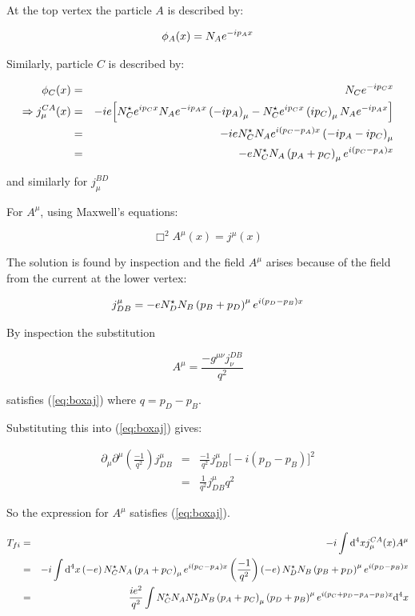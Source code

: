 At the top vertex the particle $A$ is described by:

\[
  \phi_A(x) = N_Ae^{-ip_Ax}
\]

Similarly, particle $C$ is described by:

\begin{eqnarray*}
  \phi_C(x) & = & N_Ce^{-ip_Cx} \\
  \Rightarrow j^{CA}_{\mu}(x) & = & -ie\Big[N^{\star}_Ce^{ip_Cx}N_Ae^{-ip_Ax}\left(-ip_A\right)_{\mu} - N^{\star}_C e^{ip_Cx}\left(ip_C\right)_{\mu}N_Ae^{-ip_Ax}\Big] \\
  & = & -ie N^{\star}_CN_Ae^{i\left(p_C-p_A\right)x}\left(-ip_A-ip_C\right)_{\mu} \\
  & = & -e N^{\star}_CN_A\left(p_A+p_C\right)_{\mu}e^{i\left(p_C-p_A\right)x}
\end{eqnarray*}

and similarly for $j^{BD}_{\mu}$

For $A^{\mu}$, using Maxwell's equations:

\begin{equation}
  \Box^2A^{\mu}(x) = j^{\mu}(x) \label{eq:boxaj}
\end{equation}

The solution is found by inspection and the field $A^{\mu}$ arises because of the field from the current at the lower vertex:

\[
  j^{\mu}_{DB} = -e N^{\star}_DN_B\left(p_B + p_D\right)^{\mu}e^{i\left(p_D-p_B\right)x}
\]

By inspection the substitution

\[
  A^{\mu} = \frac{-g^{\mu\nu}j^{DB}_{\nu}}{q^2}
\]

satisfies (\ref{eq:boxaj}) where $q = p_D - p_B$.

Substituting this into (\ref{eq:boxaj}) gives:

\begin{eqnarray*}
  \partial_{\mu}\partial^{\mu}\left(\frac{-1}{q^2}\right)j^{\mu}_{DB} & = & \frac{-1}{q^2}j^{\mu}_{DB}\Big[-i\left(p_D-p_B\right)\Big]^2 \\
  & = & \frac{1}{q^2}j^{\mu}_{DB}q^2
\end{eqnarray*}

So the expression for $A^{\mu}$ satisfies (\ref{eq:boxaj}).

\begin{eqnarray*}
  T_{fi} & = & -i\int\mathrm{d}^4xj^{CA}_{\mu}(x)A^{\mu} \\
  & = & -i\int\mathrm{d}^4x\left(-e\right)N^{\star}_CN_A\left(p_A + p_C\right)_{\mu}e^{i\left(p_C-p_A\right)x}\left(\frac{-1}{q^2}\right)\left(-e\right)N^{\star}_DN_B\left(p_B + p_D\right)^{\mu}e^{i\left(p_D-p_B\right)x} \\
  & = & \frac{ie^2}{q^2}\int N^{\star}_CN_AN^{\star}_DN_B\left(p_A+p_C\right)_{\mu}\left(p_D+p_B\right)^{\mu}e^{i\left(p_C+p_D-p_A-p_B\right)x}\mathrm{d}^4x
\end{eqnarray*}

